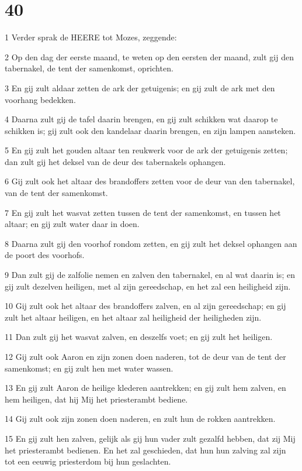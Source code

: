 \chapter{40}

\par 1 Verder sprak de HEERE tot Mozes, zeggende:
\par 2 Op den dag der eerste maand, te weten op den eersten der maand, zult gij den tabernakel, de tent der samenkomst, oprichten.
\par 3 En gij zult aldaar zetten de ark der getuigenis; en gij zult de ark met den voorhang bedekken.
\par 4 Daarna zult gij de tafel daarin brengen, en gij zult schikken wat daarop te schikken is; gij zult ook den kandelaar daarin brengen, en zijn lampen aansteken.
\par 5 En gij zult het gouden altaar ten reukwerk voor de ark der getuigenis zetten; dan zult gij het deksel van de deur des tabernakels ophangen.
\par 6 Gij zult ook het altaar des brandoffers zetten voor de deur van den tabernakel, van de tent der samenkomst.
\par 7 En gij zult het wasvat zetten tussen de tent der samenkomst, en tussen het altaar; en gij zult water daar in doen.
\par 8 Daarna zult gij den voorhof rondom zetten, en gij zult het deksel ophangen aan de poort des voorhofs.
\par 9 Dan zult gij de zalfolie nemen en zalven den tabernakel, en al wat daarin is; en gij zult dezelven heiligen, met al zijn gereedschap, en het zal een heiligheid zijn.
\par 10 Gij zult ook het altaar des brandoffers zalven, en al zijn gereedschap; en gij zult het altaar heiligen, en het altaar zal heiligheid der heiligheden zijn.
\par 11 Dan zult gij het wasvat zalven, en deszelfs voet; en gij zult het heiligen.
\par 12 Gij zult ook Aaron en zijn zonen doen naderen, tot de deur van de tent der samenkomst; en gij zult hen met water wassen.
\par 13 En gij zult Aaron de heilige klederen aantrekken; en gij zult hem zalven, en hem heiligen, dat hij Mij het priesterambt bediene.
\par 14 Gij zult ook zijn zonen doen naderen, en zult hun de rokken aantrekken.
\par 15 En gij zult hen zalven, gelijk als gij hun vader zult gezalfd hebben, dat zij Mij het priesterambt bedienen. En het zal geschieden, dat hun hun zalving zal zijn tot een eeuwig priesterdom bij hun geslachten.
